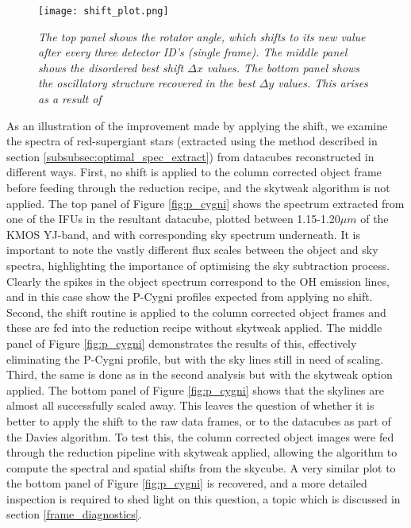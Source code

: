 \documentclass{literature}
\begin{document}
\begin{figure}[!htp]
\centering
\texttt{[image: shift\_plot.png]}
\caption{\footnotesize{\emph{The top panel shows the rotator angle, which shifts to its new value after every three detector ID's (single frame). The middle panel shows the disordered best shift $\Delta x$ values. The bottom panel shows the oscillatory structure recovered in the best $\Delta y$ values. This arises as a result of }}}
\label{fig:shift_plot}
\end{figure}

As an illustration of the improvement made by applying the shift, we examine the spectra of red-supergiant stars (extracted using the method described in section \ref{subsubsec:optimal_spec_extract}) from datacubes reconstructed in different ways. First, no shift is applied to the column corrected object frame before feeding through the reduction recipe, and the skytweak algorithm is not applied. The top panel of Figure \ref{fig:p_cygni} shows the spectrum extracted from one of the IFUs in the resultant datacube, plotted between 1.15-1.20$\mu m$ of the KMOS YJ-band, and with corresponding sky spectrum underneath. It is important to note the vastly different flux scales between the object and sky spectra, highlighting the importance of optimising the sky subtraction process. Clearly the spikes in the object spectrum correspond to the OH emission lines, and in this case show the P-Cygni profiles expected from applying no shift. Second, the shift routine is applied to the column corrected object frames and these are fed into the reduction recipe without skytweak applied. The middle panel of Figure \ref{fig:p_cygni} demonstrates the results of this, effectively eliminating the P-Cygni profile, but with the sky lines still in need of scaling. Third, the same is done as in the second analysis but with the skytweak option applied. The bottom panel of Figure \ref{fig:p_cygni} shows that the skylines are almost all successfully scaled away. This leaves the question of whether it is better to apply the shift to the raw data frames, or to the datacubes as part of the Davies algorithm. To test this, the column corrected object images were fed through the reduction pipeline with skytweak applied, allowing the algorithm to compute the spectral and spatial shifts from the skycube. A very similar plot to the bottom panel of Figure \ref{fig:p_cygni} is recovered, and a more detailed inspection is required to shed light on this question, a topic which is discussed in section \ref{frame_diagnostics}.
\end{document}
